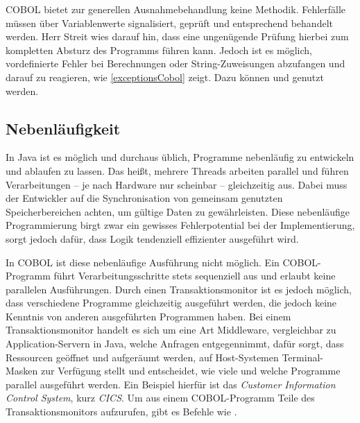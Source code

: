 COBOL bietet zur generellen Ausnahmebehandlung keine Methodik. Fehlerfälle müssen über Variablenwerte signalisiert, geprüft und entsprechend behandelt werden. Herr Streit wies darauf hin, dass eine ungenügende Prüfung hierbei zum kompletten Absturz des Programms führen kann. Jedoch ist es möglich, vordefinierte Fehler bei Berechnungen oder String-Zuweisungen abzufangen und darauf zu reagieren, wie \autoref{exceptionsCobol} zeigt. Dazu können  und  genutzt werden.


\subsection{Nebenläufigkeit}

In Java ist es möglich und durchaus üblich, Programme nebenläufig zu entwickeln und ablaufen zu lassen. Das heißt, mehrere Threads arbeiten parallel und führen Verarbeitungen -- je nach Hardware nur scheinbar -- gleichzeitig aus. Dabei muss der Entwickler auf die Synchronisation von gemeinsam genutzten Speicherbereichen achten, um gültige Daten zu gewährleisten. Diese nebenläufige Programmierung birgt zwar ein gewisses Fehlerpotential bei der Implementierung, sorgt jedoch dafür, dass Logik tendenziell effizienter ausgeführt wird.

In COBOL ist diese nebenläufige Ausführung nicht möglich. Ein COBOL-Programm führt Verarbeitungsschritte stets sequenziell aus und erlaubt keine parallelen Ausführungen. Durch einen Transaktionsmonitor ist es jedoch möglich, dass verschiedene Programme gleichzeitig ausgeführt werden, die jedoch keine Kenntnis von anderen ausgeführten Programmen haben. Bei einem Transaktionsmonitor handelt es sich um eine Art Middleware, vergleichbar zu Application-Servern in Java, welche Anfragen entgegennimmt, dafür sorgt, dass Ressourcen geöffnet und aufgeräumt werden, auf Host-Systemen Terminal-Masken zur Verfügung stellt und entscheidet, wie viele und welche Programme parallel ausgeführt werden. Ein Beispiel hierfür ist das \textit{Customer Information Control System}, kurz \textit{CICS}. Um aus einem COBOL-Programm Teile des Transaktionsmonitors aufzurufen, gibt es Befehle wie . 